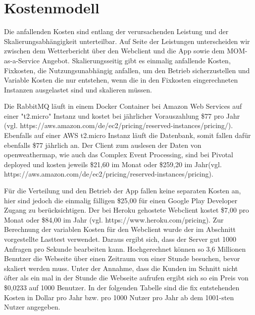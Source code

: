 \section{Kostenmodell}
Die anfallenden Kosten sind entlang der verursachenden Leistung und der Skalierungsabhängigkeit unterteilbar. Auf Seite der Leistungen unterscheiden wir zwischen dem Wetterbericht über den Webclient und die App sowie dem MOM-as-a-Service Angebot. Skalierungsseitig gibt es einmalig anfallende Kosten, Fixkosten, die Nutzungsunabhängig anfallen, um den Betrieb sicherzustellen und Variable Kosten die nur entstehen, wenn die in den Fixkosten eingerechneten Instanzen ausgelastet sind und skalieren müssen.

Die RabbitMQ läuft in einem Docker Container bei Amazon Web Services auf einer "t2.micro" Instanz und kostet bei jährlicher Vorauszahlung \$77 pro Jahr (vgl. https://aws.amazon.com/de/ec2/pricing/reserved-instances/pricing/). Ebenfalls auf einer AWS t2.micro Instanz läuft die Datenbank, somit fallen dafür ebenfalls \$77 jährlich an. Der Client zum auslesen der Daten von openweathermap, wie auch das Complex Event Processing, sind bei Pivotal deployed und kosten jeweils \$21,60 im Monat oder \$259,20 im Jahr(vgl. https://aws.amazon.com/de/ec2/pricing/reserved-instances/pricing). 


Für die Verteilung und den Betrieb der App fallen keine separaten Kosten an, hier sind jedoch die einmalig fälligen \$25,00 für einen Google Play Developer Zugang zu berücksichtigen. Der bei Heroku gehostete Webclient kostet \$7,00 pro Monat oder \$84,00 im Jahr (vgl. https://www.heroku.com/pricing). Zur Berechnung der variablen Kosten für den Webclient wurde der im Abschnitt  vorgestellte Lasttest verwendet. Daraus ergibt sich, dass der Server gut 1000 Anfragen pro Sekunde bearbeiten kann. Hochgerechnet können so 3,6 Millionen Benutzer die Webseite über einen Zeitraum von einer Stunde besuchen, bevor skaliert werden muss. Unter der Annahme, dass die Kunden im Schnitt nicht öfter als ein mal in der Stunde die Webseite aufrufen ergibt sich so ein Preis von \$0,0233 auf 1000 Benutzer. In der folgenden Tabelle sind die fix entstehenden Kosten in Dollar pro Jahr bzw. pro 1000 Nutzer pro Jahr ab dem 1001-sten Nutzer angegeben.


